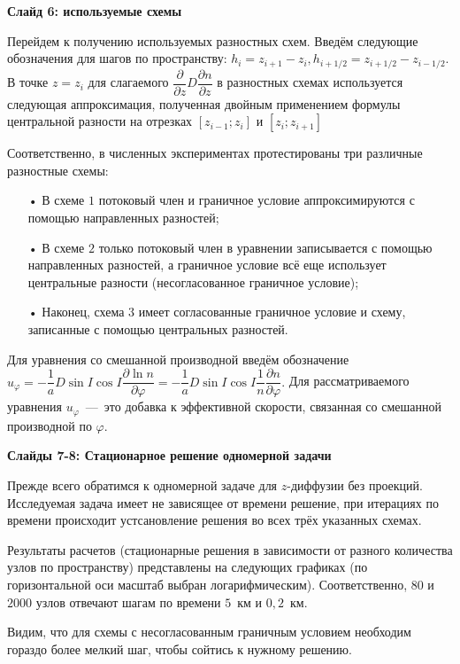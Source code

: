 \documentclass[2pt, a4paper, fleqn]{extarticle}
\begin{document}
\newpage

{\bf Слайд 6: используемые схемы}

Перейдем к получению используемых разностных схем. Введём следующие обозначения для шагов по пространству: $h_i = z_{i+1}-z_i, h_{i+1/2}=z_{i+1/2}-z_{i-1/2}$.
В точке $z=z_i$ для слагаемого $\dfrac{\partial}{\partial z}D\dfrac{\partial n}{\partial z}$ в разностных схемах используется следующая аппроксимация, полученная двойным применением формулы центральной разности на отрезках $[z_{i-1};z_i]$ и $[z_i; z_{i+1}]$

Соответственно, в численных экспериментах протестированы три различные разностные схемы: 
\begin{itemize}
\item[•] В схеме $1$ потоковый член и граничное условие аппроксимируются с помощью направленных разностей; 
\item[•] В схеме $2$ только потоковый член в уравнении записывается с помощью направленных разностей, а граничное условие всё еще использует центральные разности (несогласованное граничное условие);
\item[•] Наконец, схема $3$ имеет согласованные граничное условие и схему, записанные с помощью центральных разностей.
\end{itemize}


\smallskip

Для уравнения со смешанной производной введём обозначение $u_\varphi=-\dfrac{1}{a}D\sin I \cos I\dfrac{\partial \ln n}{\partial \varphi}=-\dfrac{1}{a}D\sin I \cos I\dfrac{1}{n}\dfrac{\partial n}{\partial \varphi}.$ Для рассматриваемого уравнения $u_\varphi$~---~это добавка к эффективной скорости, связанная со смешанной производной по $\varphi$.

\medskip

{\bf Слайды 7-8: Стационарное решение одномерной задачи}

Прежде всего обратимся к одномерной задаче для $z$-диффузии без проекций. Исследуемая задача имеет не зависящее от времени решение, при итерациях по времени происходит устсановление решения во всех трёх указанных схемах. 

Результаты расчетов (стационарные решения в зависимости от разного количества узлов по пространству) представлены на следующих графиках (по горизонтальной оси масштаб выбран логарифмическим). Соответственно, $80$ и $2000$ узлов отвечают шагам по времени $5$~км и $0{,}2$~км.

Видим, что для схемы с несогласованным граничным условием необходим гораздо более мелкий шаг, чтобы сойтись к нужному решению.
\end{document}
